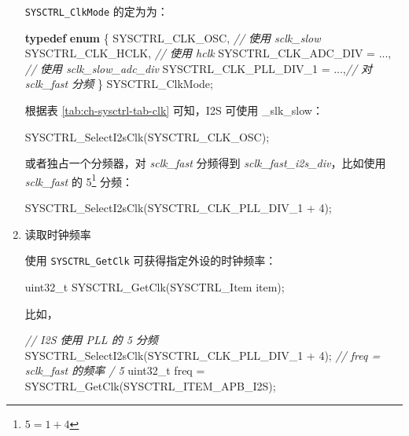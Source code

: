 \documentclass[
  12pt,
]{book}
\newenvironment{Shaded}{\begin{snugshade}}{\end{snugshade}}
\newcommand{\CommentTok}[1]{\textcolor[rgb]{0.56,0.35,0.01}{\textit{#1}}}
\newcommand{\DataTypeTok}[1]{\textcolor[rgb]{0.13,0.29,0.53}{#1}}
\newcommand{\DecValTok}[1]{\textcolor[rgb]{0.00,0.00,0.81}{#1}}
\newcommand{\KeywordTok}[1]{\textcolor[rgb]{0.13,0.29,0.53}{\textbf{#1}}}
\newcommand{\NormalTok}[1]{#1}
\begin{document}
\begin{enumerate}
  \texttt{SYSCTRL\_ClkMode} 的定为为：

\begin{Shaded}
\begin{Highlighting}[]
\KeywordTok{typedef} \KeywordTok{enum}
\NormalTok{\{}
\NormalTok{    SYSCTRL_CLK_OSC,            }\CommentTok{// 使用 sclk_slow}
\NormalTok{    SYSCTRL_CLK_HCLK,           }\CommentTok{// 使用 hclk}
\NormalTok{    SYSCTRL_CLK_ADC_DIV = ...,  }\CommentTok{// 使用 sclk_slow_adc_div}
\NormalTok{    SYSCTRL_CLK_PLL_DIV_1 = ...,}\CommentTok{// 对 sclk_fast 分频}
\NormalTok{\} SYSCTRL_ClkMode;}
\end{Highlighting}
\end{Shaded}

  根据表 \ref{tab:ch-sysctrl-tab-clk} 可知，I2S 可使用 \_slk\_slow：

\begin{Shaded}
\begin{Highlighting}[]
\NormalTok{SYSCTRL_SelectI2sClk(SYSCTRL_CLK_OSC);}
\end{Highlighting}
\end{Shaded}

  或者独占一个分频器，对 \emph{sclk\_fast} 分频得到 \emph{sclk\_fast\_i2s\_div}，比如使用 \emph{sclk\_fast}
  的 5\footnote{\(5=1 + 4\)} 分频：

\begin{Shaded}
\begin{Highlighting}[]
\NormalTok{SYSCTRL_SelectI2sClk(SYSCTRL_CLK_PLL_DIV_1 + }\DecValTok{4}\NormalTok{);}
\end{Highlighting}
\end{Shaded}
\item
  读取时钟频率

  使用 \texttt{SYSCTRL\_GetClk} 可获得指定外设的时钟频率：

\begin{Shaded}
\begin{Highlighting}[]
\DataTypeTok{uint32_t}\NormalTok{ SYSCTRL_GetClk(SYSCTRL_Item item);}
\end{Highlighting}
\end{Shaded}

  比如，

\begin{Shaded}
\begin{Highlighting}[]
\CommentTok{// I2S 使用 PLL 的 5 分频}
\NormalTok{SYSCTRL_SelectI2sClk(SYSCTRL_CLK_PLL_DIV_1 + }\DecValTok{4}\NormalTok{);}
\CommentTok{// freq = sclk_fast 的频率 / 5}
\DataTypeTok{uint32_t}\NormalTok{ freq = SYSCTRL_GetClk(SYSCTRL_ITEM_APB_I2S);}
\end{Highlighting}
\end{Shaded}
\end{enumerate}
\end{document}

